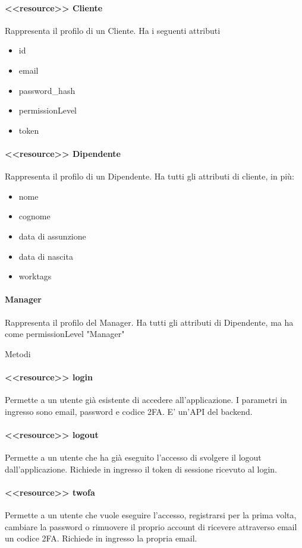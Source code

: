 \documentclass{report}
\begin{document}
\paragraph*{<<resource>> Cliente}
Rappresenta il profilo di un Cliente.
Ha i seguenti attributi
\begin{itemize}
	\item id
	\item email
	\item password\_hash
	\item permissionLevel
	\item token
\end{itemize}
\paragraph*{<<resource>> Dipendente}
Rappresenta il profilo di un Dipendente. 
Ha tutti gli attributi di cliente, in più:
\begin{itemize}
	\item nome
	\item cognome
	\item data di assunzione
	\item data di nascita
	\item worktags
\end{itemize} 
\paragraph*{Manager}
Rappresenta il profilo del Manager.
Ha tutti gli attributi di Dipendente, ma ha come permissionLevel "Manager"

Metodi
\paragraph*{<<resource>> login}
Permette a un utente già esistente di accedere all'applicazione.
I parametri in ingresso sono email, password e codice 2FA.
E' un'API del backend.

\paragraph*{<<resource>> logout}
Permette a un utente che ha già eseguito l'accesso di svolgere il logout dall'applicazione.
Richiede in ingresso il token di sessione ricevuto al login.

\paragraph*{<<resource>> twofa}
Permette a un utente che vuole eseguire l'accesso, registrarsi per la prima volta, cambiare la password o rimuovere il proprio account di ricevere attraverso email un codice 2FA.
Richiede in ingresso la propria email.
\end{document}

